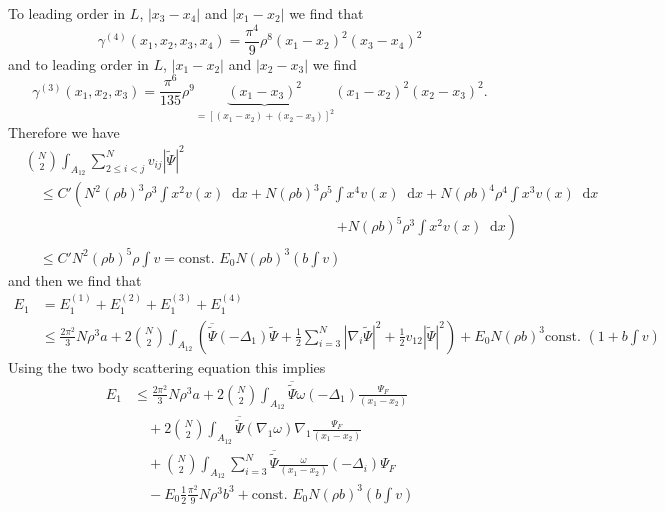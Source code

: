 \documentclass[a4paper,11pt]{article}
\newcommand{\abs}[1]{\left\lvert #1 \right\rvert}
\newcommand*\diff{\mathop{}\!\mathrm{d}}
\numberwithin{equation}{section}
\begin{document}
		To leading order in $ L $, $ \abs{x_3-x_4} $ and $ \abs{x_1-x_2} $ we find that \begin{equation}
		\gamma^{(4)}(x_1,x_2,x_3,x_4)=\frac{\pi^4}{9}\rho^8(x_1-x_2)^2(x_3-x_4)^2
		\end{equation}
		and to leading order in $ L $, $ \abs{x_1-x_2} $ and $ \abs{x_2-x_3} $ we find \begin{equation}
		\gamma^{(3)}(x_1,x_2,x_3)=\frac{\pi^6}{135}\rho^9\underbrace{(x_1-x_3)^2}_{=[(x_1-x_2)+(x_2-x_3)]^2}(x_1-x_2)^2(x_2-x_3)^2.
		\end{equation}
		Therefore we have
		\begin{equation}
		\begin{aligned}
		&\binom{N}{2}\int_{A_{12}} \sum_{2\leq i<j}^{N}v_{ij}\abs{\tilde{\Psi}}^2\\&\quad\leq C' \left(N^2(\rho b)^3\rho^3\int x^2 v(x)\diff x+N(\rho b)^3 \rho^5 \int x^4 v(x)\diff x+N(\rho b)^4\rho^4 \int x^3 v(x)\diff x\right.\\
		&\qquad \qquad \qquad \qquad\hspace{6cm}\left.+N(\rho b)^5 \rho^3 \int x^2 v(x)\diff x\right)\\
		&\quad \leq C' N^2(\rho b)^5\rho \int v=\text{const. }E_0 N (\rho b)^3 \left(b\int v\right)
		\end{aligned}
		\end{equation}
		and then we find that \begin{equation}
		\begin{aligned}
		E_1&=E_1^{(1)}+E_1^{(2)}+E_1^{(3)}+E_1^{(4)}\\&\leq \frac{2\pi^2}{3}N\rho^3 a+2\binom{N}{2}\int_{A_{12}}\left(\overline{\tilde{\Psi}}(-\Delta_1)\tilde{\Psi}+\frac{1}{2}\sum_{i=3}^{N}\abs{\nabla_i\tilde{\Psi}}^2+\frac{1}{2}v_{12}\abs{\tilde{\Psi}}^2\right)+E_0N(\rho b)^3\text{const. }\left(1+b \int v\right)
		\end{aligned}
		\end{equation}
		Using the two body scattering equation this implies \begin{equation}
		\begin{aligned}
		E_1&\leq \frac{2\pi^2}{3}N\rho^3 a+2\binom{N}{2}\int_{A_{12}}\overline{\tilde{\Psi}}\omega(-\Delta_1)\frac{\Psi_F}{(x_1-x_2)}\\&\quad+2\binom{N}{2}\int_{A_{12}}\overline{\tilde{\Psi}}(\nabla_1\omega)\nabla_1\frac{\Psi_F}{(x_1-x_2)}\\
		&\quad +\binom{N}{2}\int_{A_{12}}\sum_{i=3}^{N} \overline{\tilde{\Psi}}\frac{\omega}{(x_1-x_2)}(-\Delta_i)\Psi_F
		\\&\quad-E_0\frac{1}{2}\frac{\pi^2}{9}N\rho^3b^3+\text{const. }E_0 N (\rho b)^3 \left(b\int v\right)
		\end{aligned}
		\end{equation}
\end{document}
